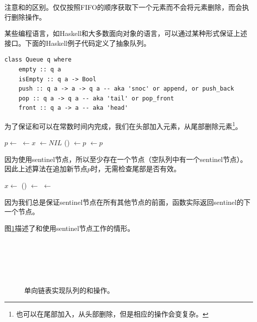\documentclass[UTF8]{article}
\begin{document}
注意和的区别。仅仅按照FIFO的顺序获取下一个元素而不会将元素删除，而会执行删除操作。

某些编程语言，如Haskell和大多数面向对象的语言，可以通过某种形式保证上述接口。下面的Haskell例子代码定义了抽象队列。

\lstset{language=Haskell}
\begin{lstlisting}
class Queue q where
    empty :: q a
    isEmpty :: q a -> Bool
    push :: q a -> a -> q a -- aka 'snoc' or append, or push_back
    pop :: q a -> q a -- aka 'tail' or pop_front
    front :: q a -> a -- aka 'head'
\end{lstlisting}

为了保证和可以在常数时间内完成，我们在头部加入元素，从尾部删除元素\footnote{也可以在尾部加入，从头部删除，但是相应的操作会变复杂。}。

\begin{algorithmic}
  \State $p \gets $ 
  \State {} $\gets x$
  \State {} $\gets NIL$
  \State {}() $\gets p$
  \State {} $\gets p$
\EndFunction
\end{algorithmic}

因为使用sentinel节点，所以至少存在一个节点（空队列中有一个sentinel节点）。因此上述算法在追加新节点$p$时，无需检查尾部是否有效。

\begin{algorithmic}
  \State $x \gets $ 
  \State {}() $\gets$ 
   
    \State {} $\gets$ 
  \EndIf
  \State \Return {}
\EndFunction
\end{algorithmic}

因为我们总是保证sentinel节点在所有其他节点的前面，函数实际返回sentinel的下一个节点。

图\ref{fig:list-queue}描述了和使用sentinel节点工作的情形。

\begin{figure}[htbp]
 \centering
  \\
  \\
  \\
  \\
 \caption{单向链表实现队列的和操作。} \label{fig:list-queue}
\end{figure}
\end{document}
